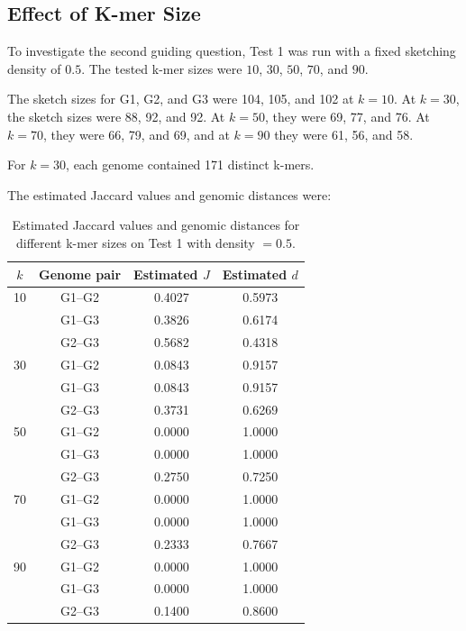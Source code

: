 \documentclass[11pt,a4paper]{article}
\begin{document}
\subsection{Effect of K-mer Size}
To investigate the second guiding question, Test 1 was run with a fixed sketching density of $0.5$. The tested k-mer sizes were
$10$, $30$, $50$, $70$, and $90$.

The sketch sizes for G1, G2, and G3 were 104, 105, and 102 at $k=10$.
At $k=30$, the sketch sizes were 88, 92, and 92. At $k=50$, they were
69, 77, and 76. At $k=70$, they were 66, 79, and 69, and at $k=90$ they
were 61, 56, and 58.

For $k=30$, each genome contained 171 distinct k-mers. 

The estimated Jaccard values and genomic distances were:

\begin{table}[H]
\centering
\small
\caption{Estimated Jaccard values and genomic distances for different
k-mer sizes on Test 1 with density $=0.5$.}
\begin{tabular}{c|c|c|c}
\toprule
$k$ & Genome pair & Estimated $J$ & Estimated $d$\\
\midrule
10 & G1--G2 & 0.4027 & 0.5973\\
   & G1--G3 & 0.3826 & 0.6174\\
   & G2--G3 & 0.5682 & 0.4318\\
\midrule
30 & G1--G2 & 0.0843 & 0.9157\\
   & G1--G3 & 0.0843 & 0.9157\\
   & G2--G3 & 0.3731 & 0.6269\\
\midrule
50 & G1--G2 & 0.0000 & 1.0000\\
   & G1--G3 & 0.0000 & 1.0000\\
   & G2--G3 & 0.2750 & 0.7250\\
\midrule
70 & G1--G2 & 0.0000 & 1.0000\\
   & G1--G3 & 0.0000 & 1.0000\\
   & G2--G3 & 0.2333 & 0.7667\\
\midrule
90 & G1--G2 & 0.0000 & 1.0000\\
   & G1--G3 & 0.0000 & 1.0000\\
   & G2--G3 & 0.1400 & 0.8600\\
\bottomrule
\end{tabular}
\end{table}
\end{document}
